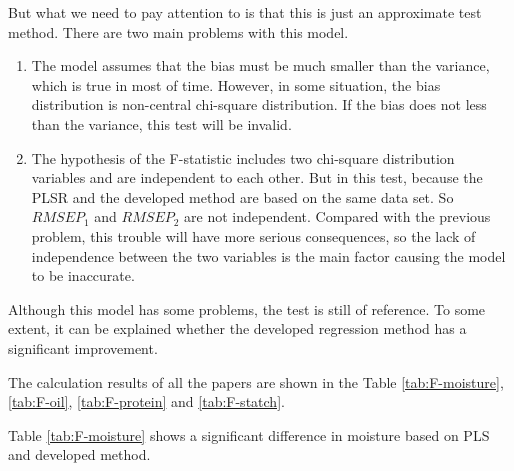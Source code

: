 \documentclass[a4paper,12pt,titlepage]{article} %
\numberwithin{equation}{section}  %
\begin{document}
		But what we need to pay attention to is that this is just an approximate test method. There are two main problems with this model.

	\begin{enumerate}
		
		\item The model assumes that the bias must be much smaller than the variance, which is true in most of time. However, in some situation, the bias distribution is non-central chi-square distribution. If the bias does not less than the variance, this test will be invalid.
		
		\item The hypothesis of the F-statistic includes two chi-square distribution variables and are independent to each other. But in this test, because the PLSR and the developed method are based on the same data set. So $RMSEP_1$ and $RMSEP_2$ are not independent. Compared with the previous problem, this trouble will have more serious consequences, so the lack of independence between the two variables is the main factor causing the model to be inaccurate.
		
	\end{enumerate}
		
		Although this model has some problems, the test is still of reference. To some extent, it can be explained whether the developed regression method has a significant improvement.
		
		The calculation results of all the papers are shown in the Table \ref{tab:F-moisture}, \ref{tab:F-oil}, \ref{tab:F-protein} and \ref{tab:F-statch}.
		
		
		Table \ref{tab:F-moisture} shows a significant difference in moisture based on PLS and developed method.
		
\end{document}

